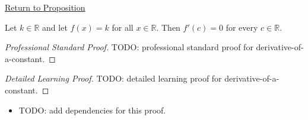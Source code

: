 \newpage
{}
\label{prf:derivative-of-a-constant}

\begin{remark*}[Return]
\hyperref[prop:derivative-of-a-constant]{Return to Proposition}
\end{remark*}

\begin{proposition*}
Let $k\in\mathbb{R}$ and let $f(x)=k$ for all $x\in\mathbb{R}$. Then $f'(c)=0$ for every $c\in\mathbb{R}$.
\end{proposition*}

\begin{proof}[Professional Standard Proof]
\LRAProofBodyStart
TODO: professional standard proof for derivative-of-a-constant.
\end{proof}

\begin{proof}[Detailed Learning Proof]
\LRAProofBodyStart
TODO: detailed learning proof for derivative-of-a-constant.
\end{proof}

\begin{remark*}
\end{remark*}

\begin{dependencies}
\begin{itemize}
  \item TODO: add dependencies for this proof.
\end{itemize}
\end{dependencies}

\clearpage

